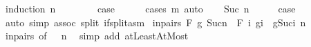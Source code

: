\begin{isabellebody}
%
\isadelimproof
%
\endisadelimproof
%
\isatagproof
{}\isamarkupfalse%
\ {\isacharparenleft}{\kern0pt}induction\ n{\isacharparenright}{\kern0pt}\isanewline
\ \ \isamarkupfalse%
\ {}\isanewline
\ \ \isamarkupfalse%
\ {\isacharquery}{\kern0pt}case\isanewline
\ \ \ \ \isamarkupfalse%
\ {\isacharparenleft}{\kern0pt}cases\ {\isachardoublequoteopen}m{\isacharequal}{\kern0pt}{}{\isachardoublequoteclose}{\isacharparenright}{\kern0pt}\ auto\isanewline
{}\isamarkupfalse%
\isanewline
\ \ \isamarkupfalse%
\ {\isacharparenleft}{\kern0pt}Suc\ n{\isacharparenright}{\kern0pt}\isanewline
\ \ \isamarkupfalse%
\ \isamarkupfalse%
\ {\isacharquery}{\kern0pt}case\isanewline
\ \ \ \ \isamarkupfalse%
\ {\isacharparenleft}{\kern0pt}auto\ simp{\isacharcolon}{\kern0pt}\ assoc\ split{\isacharcolon}{\kern0pt}\ if{\isacharunderscore}{\kern0pt}split{\isacharunderscore}{\kern0pt}asm{\isacharparenright}{\kern0pt}\isanewline
{}\isamarkupfalse%
%
\endisatagproof
{\isafoldproof}%
%
\isadelimproof
\isanewline
%
\endisadelimproof
\isanewline
{}\isamarkupfalse%
\ in{\isacharunderscore}{\kern0pt}pairs{\isacharunderscore}{\kern0pt}{}{\isacharcolon}{\kern0pt}\ {\isachardoublequoteopen}F\ g\ {\isacharbraceleft}{\kern0pt}{\isachardot}{\kern0pt}{\isachardot}{\kern0pt}Suc{\isacharparenleft}{\kern0pt}{}{\isacharasterisk}{\kern0pt}n{\isacharparenright}{\kern0pt}{\isacharbraceright}{\kern0pt}\ {\isacharequal}{\kern0pt}\ F\ {\isacharparenleft}{\kern0pt}{\isasymlambda}i{\isachardot}{\kern0pt}\ g{\isacharparenleft}{\kern0pt}{}{\isacharasterisk}{\kern0pt}i{\isacharparenright}{\kern0pt}\ \isactrlbold {\isacharasterisk}{\kern0pt}\ g{\isacharparenleft}{\kern0pt}Suc{\isacharparenleft}{\kern0pt}{}{\isacharasterisk}{\kern0pt}i{\isacharparenright}{\kern0pt}{\isacharparenright}{\kern0pt}{\isacharparenright}{\kern0pt}\ {\isacharbraceleft}{\kern0pt}{\isachardot}{\kern0pt}{\isachardot}{\kern0pt}n{\isacharbraceright}{\kern0pt}{\isachardoublequoteclose}\isanewline
%
\isadelimproof
\ \ %
\endisadelimproof
%
\isatagproof
{}\isamarkupfalse%
\ in{\isacharunderscore}{\kern0pt}pairs\ {\isacharbrackleft}{\kern0pt}of\ {\isacharunderscore}{\kern0pt}\ {}\ n{\isacharbrackright}{\kern0pt}\ \isamarkupfalse%
\ {\isacharparenleft}{\kern0pt}simp\ add{\isacharcolon}{\kern0pt}\ atLeast{}AtMost{\isacharparenright}{\kern0pt}%
\endisatagproof

\end{isabellebody}
